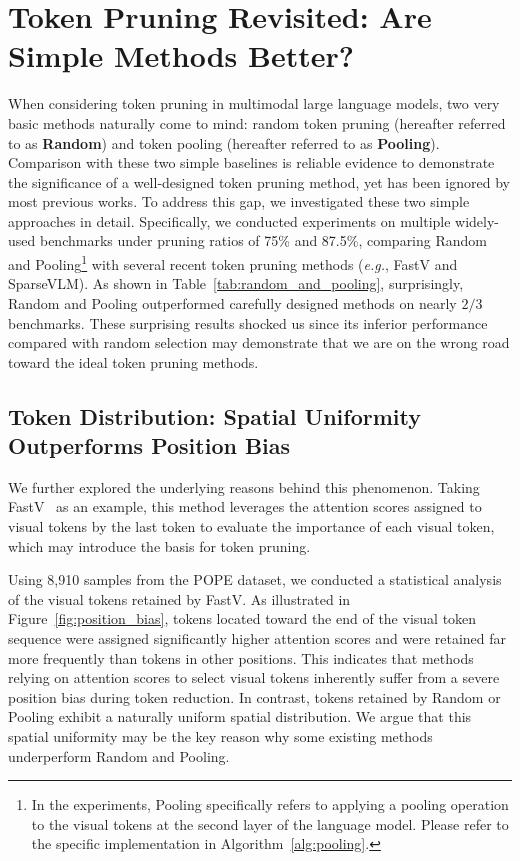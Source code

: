 
\section{Token Pruning Revisited: Are Simple Methods Better?}
When considering token pruning in multimodal large language models, two very basic methods naturally come to mind: random token pruning (hereafter referred to as \textbf{Random}) and token pooling (hereafter referred to as \textbf{Pooling}). Comparison with these two simple baselines is reliable evidence to demonstrate the significance of a well-designed token pruning method, yet has been ignored by most previous works. To address this gap, we investigated these two simple approaches in detail. Specifically, we conducted experiments on multiple widely-used benchmarks under pruning ratios of 75\% and 87.5\%, comparing Random and Pooling\footnote{In the experiments, Pooling specifically refers to applying a pooling operation to the visual tokens at the second layer of the language model. Please refer to the specific implementation in Algorithm~\ref{alg:pooling}.} with several recent token pruning methods (\emph{e.g.}, FastV and SparseVLM). 
As shown in Table~\ref{tab:random_and_pooling}, surprisingly, Random and Pooling outperformed carefully designed methods on nearly $2/3$ benchmarks.
These surprising results shocked us since its inferior performance compared with random selection may demonstrate that we are on the wrong road toward the ideal token pruning methods.



\subsection{Token Distribution: Spatial Uniformity Outperforms Position Bias}

\noindent We further explored the underlying reasons behind this phenomenon. Taking FastV~\citep{chen2024image} as an example, this method leverages the attention scores assigned to visual tokens by the last token to evaluate the importance of each visual token, which may introduce the basis for token pruning.

Using 8,910 samples from the POPE dataset, we conducted a statistical analysis of the visual tokens retained by FastV. As illustrated in Figure~\ref{fig:position_bias}, tokens located toward the end of the visual token sequence were assigned significantly higher attention scores and were retained far more frequently than tokens in other positions. This indicates that methods relying on attention scores to select visual tokens inherently suffer from a severe position bias during token reduction. In contrast, tokens retained by Random or Pooling exhibit a naturally uniform spatial distribution. We argue that this spatial uniformity may be the key reason why some existing methods underperform Random and Pooling.

